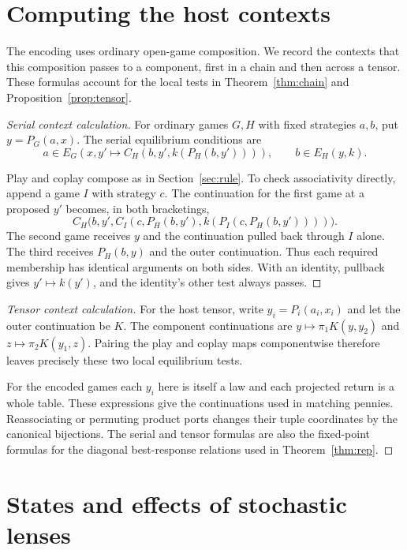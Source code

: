 \documentclass[11pt,a4paper]{article}
\theoremstyle{definition}
\begin{document}
\appendix

\section{Computing the host contexts}\label{app:host}

The encoding uses ordinary open-game composition. We record the contexts that this composition passes to a component, first in a chain and then across a tensor. These formulas account for the local tests in Theorem~\ref{thm:chain} and Proposition~\ref{prop:tensor}.

\begin{proof}[Serial context calculation]
    For ordinary games $G,H$ with fixed strategies $a,b$, put $y=P_G(a,x)$. The serial equilibrium conditions are
    \[
        a\in E_G(x,y'\mapsto C_H(b,y',k(P_H(b,y')))),\qquad
        b\in E_H(y,k).
    \]

    Play and coplay compose as in Section~\ref{sec:rule}. To check associativity directly, append a game $I$ with strategy $c$. The continuation for the first game at a proposed $y'$ becomes, in both bracketings,
    \[
        C_H\bigl(b,y',C_I(c,P_H(b,y'),k(P_I(c,P_H(b,y'))))\bigr).
    \]
    The second game receives $y$ and the continuation pulled back through $I$ alone. The third receives $P_H(b,y)$ and the outer continuation. Thus each required membership has identical arguments on both sides. With an identity, pullback gives $y'\mapsto k(y')$, and the identity's other test always passes.
\end{proof}

\begin{proof}[Tensor context calculation]
    For the host tensor, write $y_i=P_i(a_i,x_i)$ and let the outer continuation be $K$. The component continuations are $y\mapsto\pi_1 K(y,y_2)$ and $z\mapsto\pi_2 K(y_1,z)$. Pairing the play and coplay maps componentwise therefore leaves precisely these two local equilibrium tests.

    For the encoded games each $y_i$ here is itself a law and each projected return is a whole table. These expressions give the continuations used in matching pennies. Reassociating or permuting product ports changes their tuple coordinates by the canonical bijections. The serial and tensor formulas are also the fixed-point formulas for the diagonal best-response relations used in Theorem~\ref{thm:rep}.
\end{proof}

\section{States and effects of stochastic lenses}\label{app:optic}
\end{document}
